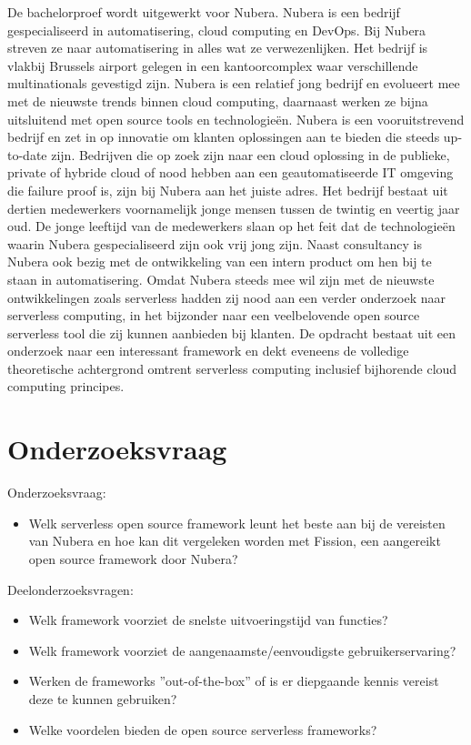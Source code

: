 De bachelorproef wordt uitgewerkt voor Nubera. Nubera is een bedrijf gespecialiseerd in automatisering, cloud computing en DevOps. Bij Nubera streven ze naar automatisering in alles wat ze verwezenlijken. Het bedrijf is vlakbij Brussels airport gelegen in een kantoorcomplex waar verschillende multinationals gevestigd zijn. Nubera is een relatief jong bedrijf en evolueert mee met de nieuwste trends binnen cloud computing, daarnaast werken ze bijna uitsluitend met open source tools en technologieën. Nubera is een vooruitstrevend bedrijf en zet in op innovatie om klanten oplossingen aan te bieden die steeds up-to-date zijn. Bedrijven die op zoek zijn naar een cloud oplossing in de publieke, private of hybride cloud of nood hebben aan een geautomatiseerde IT omgeving die failure proof is, zijn bij Nubera aan het juiste adres. Het bedrijf bestaat uit dertien medewerkers voornamelijk jonge mensen tussen de twintig en veertig jaar oud. De jonge leeftijd van de medewerkers slaan op het feit dat de technologieën waarin Nubera gespecialiseerd zijn ook vrij jong zijn. Naast consultancy is Nubera ook bezig met de ontwikkeling van een intern product om hen bij te staan in automatisering.
Omdat Nubera steeds mee wil zijn met de nieuwste ontwikkelingen zoals serverless hadden zij nood aan een verder onderzoek naar serverless computing, in het bijzonder naar een veelbelovende open source serverless tool die zij kunnen aanbieden bij klanten. De opdracht bestaat uit een onderzoek naar een interessant framework en dekt eveneens de volledige theoretische achtergrond omtrent serverless computing inclusief bijhorende cloud computing principes.

\section{Onderzoeksvraag}
\label{sec:onderzoeksvraag}

Onderzoeksvraag: 
\begin{itemize}
    \item Welk serverless open source framework leunt het beste aan bij de vereisten van Nubera en hoe kan dit vergeleken worden met Fission, een aangereikt open source framework door Nubera?
\end{itemize}

Deelonderzoeksvragen: 
\begin{itemize}
    \item Welk framework voorziet de snelste uitvoeringstijd van functies?
    \item Welk framework voorziet de aangenaamste/eenvoudigste gebruikerservaring?
    \item Werken de frameworks ''out-of-the-box'' of is er diepgaande kennis vereist deze te kunnen gebruiken?
    \item Welke voordelen bieden de open source serverless frameworks?
\end{itemize}

